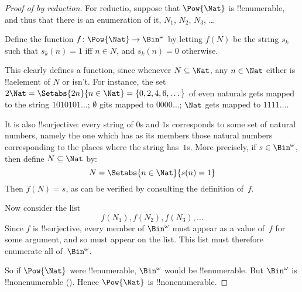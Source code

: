 \documentclass[../../../include/open-logic-section]{subfiles}
\begin{document}
\begin{proof}[Proof of {} by reduction]
For reductio, suppose that $\Pow{\Nat}$ is !!{enumerable}, and thus that
there is an enumeration of it, $N_{1}$, $N_{2}$, $N_{3}$, \dots

Define the function $f \colon \Pow{\Nat} \to \Bin^\omega$ by letting
$f(N)$ be the string $s_{k}$ such that $s_{k}(n) = 1$ iff $n \in N$,
and $s_k(n) = 0$ otherwise.  

This clearly defines a function, since
whenever $N \subseteq \Nat$, any $n \in \Nat$ either is
!!a{element} of $N$ or isn't.  For instance, the set $2\Nat = \Setabs{2n}{n \in \Nat} = \{0,2,
4, 6, \dots\}$ of even naturals gets mapped to the string
$1010101\dots$; $\emptyset$ gits mapped to $0000\dots$; $\Nat$ gets mapped to $1111\dots$.

It is also !!{surjective}: every string of $0$s and $1$s corresponds
to some set of natural numbers, namely the one which has as its
members those natural numbers  corresponding to the places where the string
has~$1$s. More precisely, if $s \in \Bin^\omega$, then define $N
\subseteq \Nat$ by:
\[
N = \Setabs{n \in \Nat}{s(n) = 1}
\]
Then $f(N) = s$, as can be verified by consulting the definition
of~$f$. 

Now consider the list
\[
f(N_1), f(N_2), f(N_3), \dots
\]
Since $f$ is !!{surjective}, every member of $\Bin^\omega$ must
appear as a value of~$f$ for some argument, and so must appear on the
list. This list must therefore enumerate all of~$\Bin^\omega$.

So if $\Pow{\Nat}$ were !!{enumerable}, $\Bin^\omega$ would be
!!{enumerable}.  But $\Bin^\omega$ is !!{nonenumerable}
(). Hence $\Pow{\Nat}$ is
!!{nonenumerable}.
\end{proof}

\end{document}
